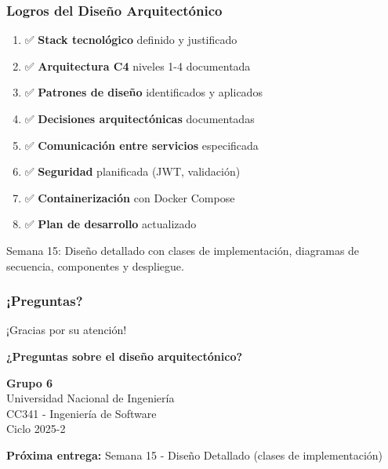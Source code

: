 \documentclass[aspectratio=169]{beamer}
\begin{document}
\begin{frame}
\frametitle{Logros del Diseño Arquitectónico}

\begin{enumerate}
\item ✅ \textbf{Stack tecnológico} definido y justificado
\item ✅ \textbf{Arquitectura C4} niveles 1-4 documentada
\item ✅ \textbf{Patrones de diseño} identificados y aplicados
\item ✅ \textbf{Decisiones arquitectónicas} documentadas
\item ✅ \textbf{Comunicación entre servicios} especificada
\item ✅ \textbf{Seguridad} planificada (JWT, validación)
\item ✅ \textbf{Containerización} con Docker Compose
\item ✅ \textbf{Plan de desarrollo} actualizado
\end{enumerate}

\vspace{0.5cm}

\begin{tcolorbox}[colback=green!5, colframe=green!50, title=Próximos Pasos]
Semana 15: Diseño detallado con clases de implementación, diagramas de secuencia, componentes y despliegue.
\end{tcolorbox}

\end{frame}

\begin{frame}
\frametitle{¡Preguntas?}

\begin{center}
\Large ¡Gracias por su atención! \\

\vspace{1cm}

\textbf{¿Preguntas sobre el diseño arquitectónico?}

\vspace{1cm}

\normalsize
\textbf{Grupo 6}\\
Universidad Nacional de Ingeniería\\
CC341 - Ingeniería de Software\\
Ciclo 2025-2

\vspace{0.5cm}

\textbf{Próxima entrega:} Semana 15 - Diseño Detallado (clases de implementación)

\end{center}

\end{frame}
\end{document}
